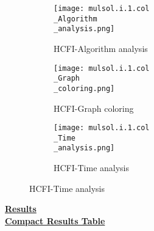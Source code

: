 \documentclass[10pt]{article}
\begin{document}
\graphicspath{{./Core1/Solutions/HCFI/mulsol.i.1.col}}
\begin{figure}[H]
\begin{subfigure}{.33\textwidth}
  \centering
  \texttt{[image: mulsol.i.1.col\\\_Algorithm\\\_analysis.png]}
  \caption{HCFI-Algorithm analysis}
   \label{fig:subfig1}
\end{subfigure}%
\begin{subfigure}{.33\textwidth}
  \centering
  \texttt{[image: mulsol.i.1.col\\\_Graph\\\_coloring.png]}
  \caption{HCFI-Graph coloring}
  \label{fig:subfig2}
\end{subfigure}
\begin{subfigure}{.33\textwidth}
  \centering
  \texttt{[image: mulsol.i.1.col\\\_Time\\\_analysis.png]}
  \caption{HCFI-Time analysis}
  \end{subfigure}
\end{figure}
\vspace{2cm}
\begin{center}
\hyperlink{page.8}{\textbf{Results}}\\
\vspace{0.5cm}
\hyperlink{page.71}{\textbf{Compact Results Table}}
\end{center}
\pagebreak
\end{document}
